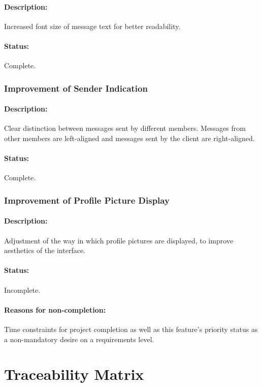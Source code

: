 \documentclass[11pt]{article}
\begin{document}
\paragraph{Description:} Increased font size of message text for better readability.
\paragraph{Status:} Complete. 

\subsubsection{Improvement of Sender Indication}
\paragraph{Description:} Clear distinction between messages sent by different members. Messages from other members are left-aligned and messages sent by the client are right-aligned.
\paragraph{Status:} Complete.

\subsubsection{Improvement of Profile Picture Display}
\paragraph{Description:} Adjustment of the way in which profile pictures are displayed, to improve aesthetics of the interface.
\paragraph{Status:} Incomplete.
\paragraph{Reasons for non-completion:} Time constraints for project completion as well as this feature's priority status as a non-mandatory desire on a requirements level.

\section{Traceability Matrix}
\end{document}
